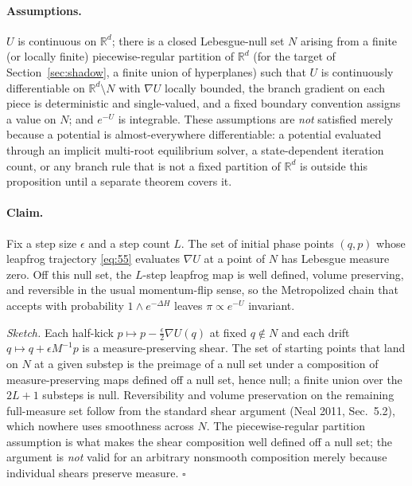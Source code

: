 \documentclass[11pt]{article}
\begin{document}
\paragraph{Assumptions.}
$U$ is continuous on $\mathbb R^d$; there is a closed Lebesgue-null set $N$
arising from a finite (or locally finite) piecewise-regular partition of
$\mathbb R^d$ (for the target of Section~\ref{sec:shadow}, a finite union
of hyperplanes) such that $U$ is continuously differentiable on
$\mathbb R^d\setminus N$ with $\nabla U$ locally bounded, the branch gradient
on each piece is deterministic and single-valued, and a fixed boundary
convention assigns a value on $N$; and $e^{-U}$ is integrable. These
assumptions are \emph{not} satisfied merely because a potential is
almost-everywhere differentiable: a potential evaluated through an implicit
multi-root equilibrium solver, a state-dependent iteration count, or any
branch rule that is not a fixed partition of $\mathbb R^d$ is outside this
proposition until a separate theorem covers it.

\paragraph{Claim.}
Fix a step size $\epsilon$ and a step count $L$. The set of initial phase
points $(q,p)$ whose leapfrog trajectory \eqref{eq:55} evaluates $\nabla U$
at a point of $N$ has Lebesgue measure zero. Off this null set, the $L$-step
leapfrog map is well defined, volume preserving, and reversible in the usual
momentum-flip sense, so the Metropolized chain that accepts with probability
$1\wedge e^{-\Delta H}$ leaves $\pi\propto e^{-U}$ invariant.

\emph{Sketch.} Each half-kick $p\mapsto p-\tfrac\epsilon2\nabla U(q)$ at
fixed $q\notin N$ and each drift $q\mapsto q+\epsilon M^{-1}p$ is a
measure-preserving shear. The set of starting points that land on $N$ at a
given substep is the preimage of a null set under a composition of
measure-preserving maps defined off a null set, hence null; a finite union
over the $2L+1$ substeps is null. Reversibility and volume preservation on
the remaining full-measure set follow from the standard shear argument (Neal
2011, Sec.~5.2), which nowhere uses smoothness across $N$. The
piecewise-regular partition assumption is what makes the shear composition
well defined off a null set; the argument is \emph{not} valid for an
arbitrary nonsmooth composition merely because individual shears preserve
measure. $\square$
\end{document}
